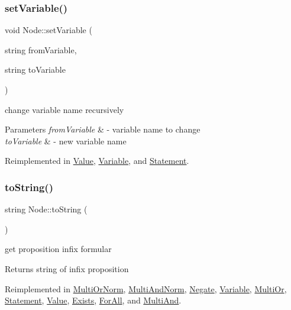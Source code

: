 \subsubsection{\texorpdfstring{set\+Variable()}{setVariable()}}
{\footnotesize\ttfamily void Node\+::set\+Variable (\begin{DoxyParamCaption}\item[{string}]{from\+Variable,  }\item[{string}]{to\+Variable }\end{DoxyParamCaption})\hspace{0.3cm}{\ttfamily [virtual]}}



change variable name recursively 


\begin{DoxyParams}{Parameters}
{\em from\+Variable} & -\/ variable name to change \\
\hline
{\em to\+Variable} & -\/ new variable name \\
\hline
\end{DoxyParams}


Reimplemented in \hyperlink{class_value_a807844066d6d76e9b9f3eda03cef37b1}{Value}, \hyperlink{class_variable_a6290fe9c9e63b4c0a980de1333902557}{Variable}, and \hyperlink{class_statement_a96d67118f27e64d72b189d837103a126}{Statement}.

\mbox{\label{class_node_a0746502074a232243dcac3b96f3ce2d0}} 
\subsubsection{\texorpdfstring{to\+String()}{toString()}}
{\footnotesize\ttfamily string Node\+::to\+String (\begin{DoxyParamCaption}{ }\end{DoxyParamCaption})\hspace{0.3cm}{\ttfamily [virtual]}}



get proposition infix formular 

\begin{DoxyReturn}{Returns}
string of infix proposition 
\end{DoxyReturn}


Reimplemented in \hyperlink{class_multi_or_norm_ad70e2ca31478183da21ee1995964c2c3}{Multi\+Or\+Norm}, \hyperlink{class_multi_and_norm_a84940789d331007c430096a38f60d124}{Multi\+And\+Norm}, \hyperlink{class_negate_aab87b217ffd5c8ba404022a5f4cec220}{Negate}, \hyperlink{class_variable_a5b0b0e25200631521dc5bbc8df22acdc}{Variable}, \hyperlink{class_multi_or_ade4d5f7db13aca1020dba2396ef00dd7}{Multi\+Or}, \hyperlink{class_statement_a0e9ec611dc39c53ed01cf0f877db9881}{Statement}, \hyperlink{class_value_aa774521b29b4f0c77eb6d57b5a6fb3a0}{Value}, \hyperlink{class_exists_a8eda64d4fd60158c15b38f64a4596068}{Exists}, \hyperlink{class_for_all_a086dc15d85fe4874c477c72a40577b85}{For\+All}, and \hyperlink{class_multi_and_a035299de4f81beb44a9a5df63b0d5178}{Multi\+And}.

